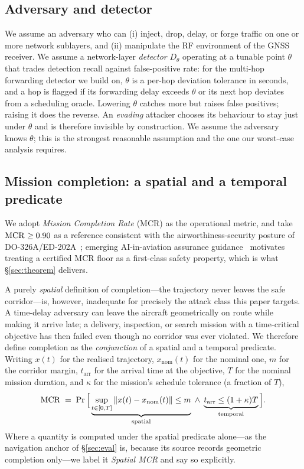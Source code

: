 \subsection{Adversary and detector}
We assume an adversary who can (i) inject, drop, delay, or forge traffic on one
or more network sublayers, and (ii) manipulate the RF environment of the GNSS
receiver. We assume a network-layer \emph{detector} $D_\theta$ operating at a
tunable point $\theta$ that trades detection recall against false-positive rate:
for the multi-hop forwarding detector we build on, $\theta$ is a per-hop
deviation tolerance in seconds, and a hop is flagged if its forwarding delay
exceeds $\theta$ or its next hop deviates from a scheduling oracle. Lowering
$\theta$ catches more but raises false positives; raising it does the reverse.
An \emph{evading} attacker chooses its behaviour to stay just under $\theta$ and
is therefore invisible by construction. We assume the adversary knows $\theta$;
this is the strongest reasonable assumption and the one our worst-case analysis
requires.

\subsection{Mission completion: a spatial and a temporal predicate}
\label{sec:mcr}
We adopt \emph{Mission Completion Rate} (MCR) as the operational metric, and
take $\mathrm{MCR}\ge0.90$ as a reference consistent with the airworthiness-security
posture of DO-326A/ED-202A~\cite{do326a}; emerging AI-in-aviation assurance
guidance~\cite{ed324} motivates treating a certified MCR floor as a first-class
safety property, which is what \S\ref{sec:theorem} delivers.

A purely \emph{spatial} definition of completion---the trajectory never leaves
the safe corridor---is, however, inadequate for precisely the attack class this
paper targets. A time-delay adversary can leave the aircraft geometrically on
route while making it arrive late; a delivery, inspection, or search mission
with a time-critical objective has then failed even though no corridor was ever
violated. We therefore define completion as the \emph{conjunction} of a spatial
and a temporal predicate. Writing $x(t)$ for the realised trajectory,
$x_{\mathrm{nom}}(t)$ for the nominal one, $m$ for the corridor margin,
$t_{\mathrm{arr}}$ for the arrival time at the objective, $T$ for the nominal
mission duration, and $\kappa$ for the mission's schedule tolerance
(a fraction of $T$),
\begin{equation}
\label{eq:mcr}
\mathrm{MCR} \;=\; \Pr\Big[\underbrace{\sup_{t\in[0,T]}\left\lVert x(t)-x_{\mathrm{nom}}(t)\right\rVert\le m}_{\text{spatial}}
\;\wedge\;
\underbrace{t_{\mathrm{arr}}\le(1+\kappa)T}_{\text{temporal}}\Big].
\end{equation}
Where a quantity is computed under the spatial predicate alone---as the
navigation anchor of \S\ref{sec:eval} is, because its source records geometric
completion only---we label it \emph{Spatial MCR} and say so explicitly.

